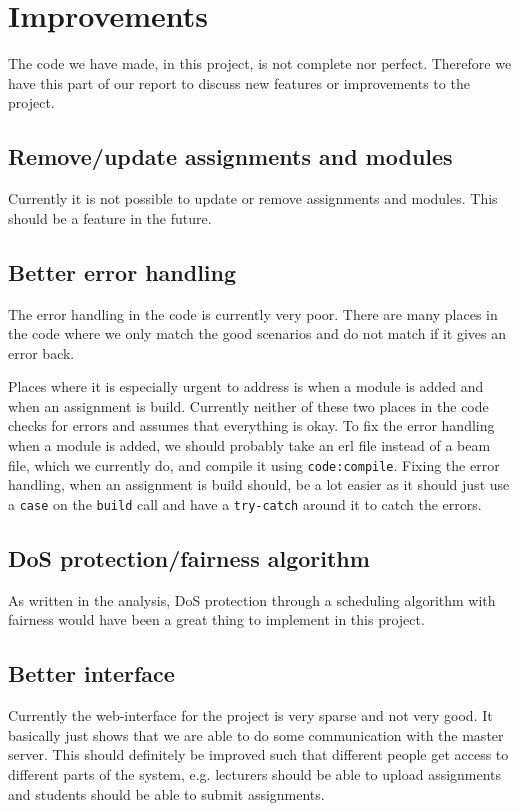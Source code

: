 \chapter{Improvements}
The code we have made, in this project, is not complete nor perfect. Therefore
we have this part of our report to discuss new features or improvements to the
project.

\section{Remove/update assignments and modules}
Currently it is not possible to update or remove assignments and modules. This
should be a feature in the future.

\section{Better error handling}
The error handling in the code is currently very poor. There are many places in
the code where we only match the good scenarios and do not match if it gives an
error back.

Places where it is especially urgent to address is when a module is added and
when an assignment is build. Currently neither of these two places in the code
checks for errors and assumes that everything is okay. To fix the error handling
when a module is added, we should probably take an erl file instead of a beam
file, which we currently do, and compile it using \texttt{code:compile}.
Fixing the error handling, when an assignment is build should, be a lot easier
as it should just use a \texttt{case} on the \texttt{build} call and have a
\texttt{try-catch} around it to catch the errors.

\section{DoS protection/fairness algorithm}
As written in the analysis, DoS protection through a scheduling algorithm with
fairness would have been a great thing to implement in this project.

\section{Better interface}
Currently the web-interface for the project is very sparse and not very good.
It basically just shows that we are able to do some communication with the
master server. This should definitely be improved such that different people get
access to different parts of the system, e.g. lecturers should be able to upload
assignments and students should be able to submit assignments.


